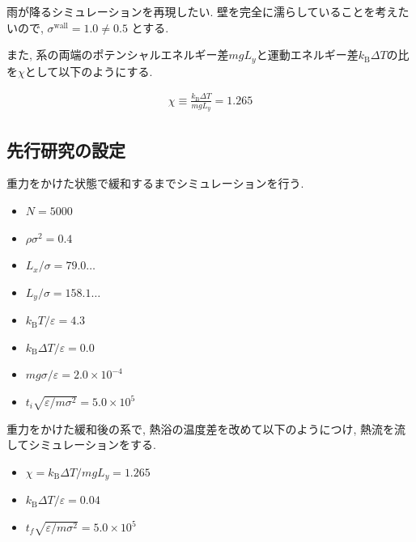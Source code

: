 \documentclass[dvipdfmx]{jsarticle}
\numberwithin{equation}{subsection}
\begin{document}
雨が降るシミュレーションを再現したい. 壁を完全に濡らしていることを考えたいので, $\sigma^{\text{wall}}=1.0\neq 0.5$ とする.

また, 系の両端のポテンシャルエネルギー差$mgL_y$と運動エネルギー差$k_{\text{B}}\Delta T$の比を$\chi$として以下のようにする.

\begin{align}
  \chi \equiv \frac{k_{\text{B}}\Delta T}{mgL_{y}} = 1.265
\end{align}

\subsection{先行研究の設定}

重力をかけた状態で緩和するまでシミュレーションを行う.

\begin{itemize}
  \item $N = 5000$
  \item $\rho \sigma^2 = 0.4$
  \item $L_x / \sigma = 79.0\dots$
  \item $L_y / \sigma = 158.1\dots$
  \item $k_{\text{B}} T/\varepsilon = 4.3$
  \item $k_{\text{B}} \Delta T/\varepsilon = 0.0$
  \item $mg\sigma/\varepsilon = 2.0 \times 10^{-4}$
  \item $t_i \sqrt{\varepsilon / m \sigma^2} = 5.0 \times 10^{5}$
\end{itemize}

重力をかけた緩和後の系で, 熱浴の温度差を改めて以下のようにつけ, 熱流を流してシミュレーションをする.

\begin{itemize}
  \item $\chi = k_{\text{B}}\Delta T / mg L_y = 1.265$
  \item $k_{\text{B}} \Delta T/\varepsilon = 0.04$
  \item $t_f \sqrt{\varepsilon / m \sigma^2} = 5.0 \times 10^{5}$
\end{itemize}



\end{document}
